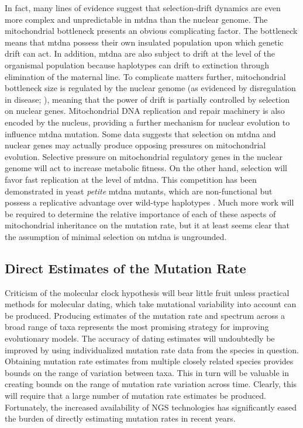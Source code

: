 \documentclass[12pt,twoside]{reedthesis}
\begin{document}
In fact, many lines of evidence suggest that selection-drift dynamics are even more complex and unpredictable in \gls{mtdna} than the nuclear genome.
The mitochondrial bottleneck presents an obvious complicating factor.
The bottleneck means that \gls{mtdna} possess their own insulated population upon which genetic drift can act. 
In addition, \gls{mtdna} are also subject to drift at the level of the organismal population because haplotypes can drift to extinction through elimination of the maternal line.
To complicate matters further, mitochondrial bottleneck size is regulated by the nuclear genome (as evidenced by disregulation in disease; \citealp{clay_montier_number_2009}), meaning that the power of drift is partially controlled by selection on nuclear genes.
Mitochondrial DNA replication and repair machinery is also encoded by the nucleus, providing a further mechanism for nuclear evolution to influence \gls{mtdna} mutation.
Some data suggests that selection on \gls{mtdna} and nuclear genes may actually produce opposing pressures on mitochondrial evolution.
Selective pressure on mitochondrial regulatory genes in the nuclear genome will act to increase metabolic fitness.
On the other hand, selection will favor fast replication at the level of \gls{mtdna}.
This competition has been demonstrated in yeast \textit{petite} \gls{mtdna} mutants, which are non-functional but possess a replicative advantage over wild-type haplotypes \citep{de_zamaroczy_origins_1981, taylor_conflicting_2002}.
Much more work will be required to determine the relative importance of each of these aspects of mitochondrial inheritance on the mutation rate, but it at least seems clear that the assumption of minimal selection on \gls{mtdna} is ungrounded.

\subsection{Direct Estimates of the Mutation Rate}
Criticism of the molecular clock hypothesis will bear little fruit unless practical methods for molecular dating, which take mutational variability into account can be produced.
Producing estimates of the mutation rate and spectrum across a broad range of taxa represents the most promising strategy for improving evolutionary models.
The accuracy of dating estimates will undoubtedly be improved by using individualized mutation rate data from the species in question.
Obtaining mutation rate estimates from multiple closely related species provides bounds on the range of variation between taxa.
This in turn will be valuable in creating bounds on the range of mutation rate variation across time.
Clearly, this will require that a large number of mutation rate estimates be produced.
Fortunately, the increased availability of \gls{NGS} technologies has significantly eased the burden of directly estimating mutation rates in recent years. 
\end{document}
